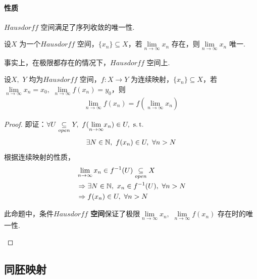 \vspace*{2em}
\paragraph{性质}
	$Hausdorff$ 空间满足了序列收敛的唯一性.
	\begin{proposition}\label{prop 1.2.2}
		设$X$ 为一个$Hausdorff$ 空间，$\{ x_n \} \subseteq X$，若$\underset{n \to \infty}{\lim}{x_n}$ 存在，则$\underset{n \to \infty}{\lim}{x_n}$ 唯一.
	\end{proposition}

\vspace*{1em}
	事实上，在极限都存在的情况下，$Hausdorff$ 空间上.
	\begin{proposition}\label{prop 1.2.3}
		设$X , \,\, Y$ 均为$Hausdorff$ 空间，$f : X \longrightarrow Y$ 为连续映射，$\{ x_n \} \subseteq X$，若$\underset{n \to \infty}{\lim}{x_n} = x_0 , \,\, \underset{n \to \infty}{\lim}{f(x_n)} = y_0$，则
		\begin{align}
			\lim_{n \to \infty}{f(x_n)} = f(\lim_{n \to \infty}{x_n})
		\end{align}
		
		\begin{proof}
			即证：$\forall U \underset{open}{\subseteq} Y , \,\, f(\underset{n \to \infty}{\lim}{x_n}) \in U , \,\, \operatorname{s.t.}$
			\begin{align}
				\exists N \in \mathbb{N} , \,\, f(x_n) \in U , \,\, \forall n > N
			\end{align}
			根据连续映射的性质，
			\begin{align}
				&\lim_{n \to \infty}{x_n} \in f^{-1}(U) \underset{open}{\subseteq} X\\
				&\Rightarrow \exists N \in \mathbb{N} , \,\, x_n \in f^{-1}(U) , \,\, \forall n > N\\
				&\Rightarrow f(x_n) \in U , \,\, \forall n > N
			\end{align}
			\begin{rmk}
				此命题中，条件\textbf{$Hausdorff$ 空间}保证了极限$\underset{n \to \infty}{\lim}{x_n} , \,\, \underset{n \to \infty}{\lim}{f(x_n)}$ 存在时的唯一性.
			\end{rmk}
		\end{proof}
	\end{proposition}

\newpage
\subsection{同胚映射}

